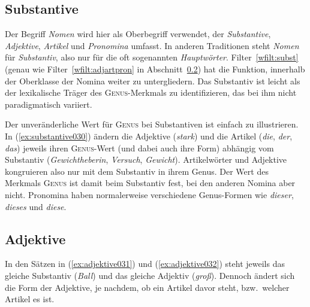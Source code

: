 \subsection{Substantive}
\label{sec:substantive}

Der Begriff \textit{Nomen} wird hier als Oberbegriff verwendet, der \textit{Substantive}, \textit{Adjektive}, \textit{Artikel} und \textit{Pronomina} umfasst.
In anderen Traditionen steht \textit{Nomen} für \textit{Substantiv}, also nur für die oft sogenannten \textit{Hauptwörter}.
Filter~\ref{wfilt:subst} (genau wie Filter~\ref{wfilt:adjartpron} in Abschnitt~\ref{sec:adjektive}) hat die Funktion, innerhalb der Oberklasse der Nomina weiter zu untergliedern.
Das Substantiv ist leicht als der lexikalische Träger des \textsc{Genus}-Merkmals zu identifizieren, das bei ihm nicht paradigmatisch variiert.


Der unveränderliche Wert für \textsc{Genus} bei Substantiven ist einfach zu illustrieren.
In (\ref{ex:substantive030}) ändern die Adjektive (\textit{stark}) und die Artikel (\textit{die}, \textit{der}, \textit{das}) jeweils ihren \textsc{Genus}-Wert (und dabei auch ihre Form) abhängig vom Substantiv (\textit{Gewichtheberin}, \textit{Versuch}, \textit{Gewicht}).
Artikelwörter und Adjektive kongruieren also nur mit dem Substantiv in ihrem Genus.
Der Wert des Merkmals \textsc{Genus} ist damit beim Substantiv fest, bei den anderen Nomina aber nicht.
Pronomina haben normalerweise verschiedene Genus-Formen wie \textit{dieser}, \textit{dieses} und \textit{diese}.

\begin{exe}
  \ex\label{ex:substantive030}
  \begin{xlist}
  \end{xlist}
\end{exe}

\subsection{Adjektive}
\label{sec:adjektive}

In den Sätzen in (\ref{ex:adjektive031}) und (\ref{ex:adjektive032}) steht jeweils das gleiche Substantiv (\textit{Ball}) und das gleiche Adjektiv (\textit{groß}).
Dennoch ändert sich die Form der Adjektive, je nachdem, ob ein Artikel davor steht, bzw.\ welcher Artikel es ist.

